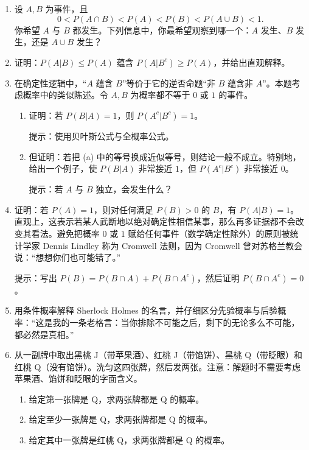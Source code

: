 \documentclass[UTF8, 12pt, fontset=fandol, oneside]{ctexart}
\begin{document}
\begin{enumerate}
  \item 设 $A,B$ 为事件，且
  \[
    0<P(A\cap B)<P(A)<P(B)<P(A\cup B)<1.
  \]
  你希望 $A$ 与 $B$ 都发生。下列信息中，你最希望观察到哪一个：$A$ 发生、$B$ 发生，还是 $A\cup B$ 发生？

  \item 证明：$P(A|B)\le P(A)$ 蕴含 $P(A|B^c)\ge P(A)$，并给出直观解释。

  \item 在确定性逻辑中，“$A$ 蕴含 $B$”等价于它的逆否命题“非 $B$ 蕴含非 $A$”。本题考虑概率中的类似陈述。令 $A,B$ 为概率都不等于 $0$ 或 $1$ 的事件。
  \begin{enumerate}
    \item 证明：若 $P(B|A)=1$，则 $P(A^c|B^c)=1$。

    提示：使用贝叶斯公式与全概率公式。
    \item 但证明：若把 (a) 中的等号换成近似等号，则结论一般不成立。特别地，给出一个例子，使 $P(B|A)$ 非常接近 $1$，但 $P(A^c|B^c)$ 非常接近 $0$。

    提示：若 $A$ 与 $B$ 独立，会发生什么？
  \end{enumerate}

  \item 证明：若 $P(A)=1$，则对任何满足 $P(B)>0$ 的 $B$，有 $P(A|B)=1$。直观上，这表示若某人武断地以绝对确定性相信某事，那么再多证据都不会改变其看法。避免把概率 $0$ 或 $1$ 赋给任何事件（数学确定性除外）的原则被统计学家 Dennis Lindley 称为 Cromwell 法则，因为 Cromwell 曾对苏格兰教会说：“想想你们也可能错了。”

  提示：写出 $P(B)=P(B\cap A)+P(B\cap A^c)$，然后证明 $P(B\cap A^c)=0$。

  \item 用条件概率解释 Sherlock Holmes 的名言，并仔细区分先验概率与后验概率：“这是我的一条老格言：当你排除不可能之后，剩下的无论多么不可能，都必然是真相。”

  \item 从一副牌中取出黑桃 J（带苹果酒）、红桃 J（带馅饼）、黑桃 Q（带眨眼）和红桃 Q（没有馅饼）。洗匀这四张牌，然后发两张。注意：解题时不需要考虑苹果酒、馅饼和眨眼的字面含义。
  \begin{enumerate}
    \item 给定第一张牌是 Q，求两张牌都是 Q 的概率。
    \item 给定至少一张牌是 Q，求两张牌都是 Q 的概率。
    \item 给定其中一张牌是红桃 Q，求两张牌都是 Q 的概率。
  \end{enumerate}


\end{enumerate}
\end{document}
